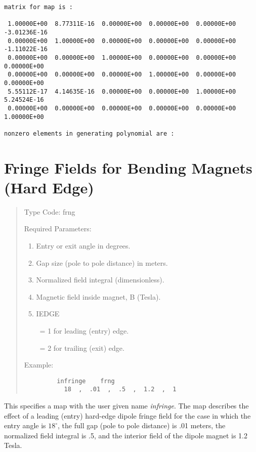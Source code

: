 \begin{footnotesize}
\begin{verbatim}
matrix for map is :

 1.00000E+00  8.77311E-16  0.00000E+00  0.00000E+00  0.00000E+00 -3.01236E-16
 0.00000E+00  1.00000E+00  0.00000E+00  0.00000E+00  0.00000E+00 -1.11022E-16
 0.00000E+00  0.00000E+00  1.00000E+00  0.00000E+00  0.00000E+00  0.00000E+00
 0.00000E+00  0.00000E+00  0.00000E+00  1.00000E+00  0.00000E+00  0.00000E+00
 5.55112E-17  4.14635E-16  0.00000E+00  0.00000E+00  1.00000E+00  5.24524E-16
 0.00000E+00  0.00000E+00  0.00000E+00  0.00000E+00  0.00000E+00  1.00000E+00

nonzero elements in generating polynomial are :
\end{verbatim}
\end{footnotesize}

\newpage
\section{Fringe Fields for Bending Magnets (Hard Edge)}
\begin{quotation}
\noindent Type Code:  frng
\vspace{5mm}

\noindent Required Parameters:
\begin{enumerate}
      \item  Entry or exit angle in degrees.
      \item  Gap size (pole to pole distance) in meters.
      \item  Normalized field integral (dimensionless).
      \item  Magnetic field inside magnet, B (Tesla).
      \item  IEDGE

             \ = 1 for leading (entry) edge.

             \ = 2 for trailing (exit) edge.
\end{enumerate}

\vspace{5mm}
\noindent Example:
\begin{verbatim}
         infringe    frng
           18  ,  .01  ,  .5  ,  1.2  ,  1
\end{verbatim}
\end{quotation}
This specifies a map with the user given name {\em infringe}.  The map describes
the effect of a leading (entry) hard-edge dipole fringe field for the case
in which the entry angle is $18^\circ$, the full gap (pole to pole distance) is .01 meters, the normalized field integral is .5, and the interior field of the dipole
magnet is 1.2 Tesla.

